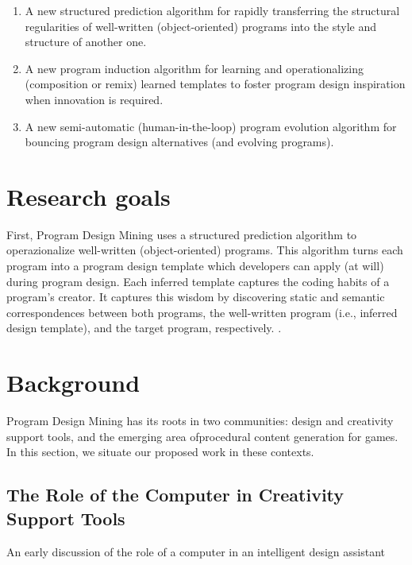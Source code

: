 \begin{enumerate}
	\item A new structured prediction algorithm for rapidly transferring 
	the structural regularities of well-written (object-oriented) programs 
	into the style and structure of another one.
	\item A new program induction algorithm for learning and operationalizing 
	(composition or remix) learned templates to foster program design 
	inspiration when innovation is required.
	\item A new semi-automatic (human-in-the-loop) program evolution algorithm 
	for bouncing program design alternatives (and evolving programs). 
\end{enumerate}

\section*{Research goals} %
\label{sec:goals}

First, Program Design Mining uses a structured prediction algorithm to operazionalize 
well-written (object-oriented) programs. This algorithm turns each program into a 
program design template which developers can apply (at will) during program design. 
Each inferred template captures the coding habits of a program's creator. It captures 
this wisdom by discovering static and semantic correspondences between both programs, 
the well-written program (i.e., inferred design template), and the target program, 
respectively. .

\section*{Background} %
\label{sec:background}

Program Design Mining has its roots in two communities: design and creativity 
support tools, and the emerging area ofprocedural content generation for games. 
In this section, we situate our proposed work in these contexts.

\subsection*{The Role of the Computer in Creativity Support Tools} %
\label{subsec:creativity}

An early discussion of the role of a computer in an intelligent design assistant

